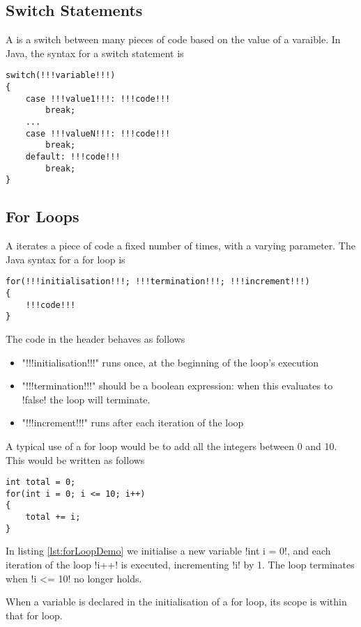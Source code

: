 \documentclass[11pt]{article}
\begin{document}
\subsection{Switch Statements}
A  is a switch between many pieces of code based on the value of a varaible. In Java, the syntax for a switch statement is
\vspace{-20pt}
\begin{lstlisting}[style=javaSyntax]
switch(!!!variable!!!)
{
    case !!!value1!!!: !!!code!!!
        break;
    ...
    case !!!valueN!!!: !!!code!!!
        break;
    default: !!!code!!!
        break;
}
\end{lstlisting}
\subsection{For Loops} \label{sec:forLoops}
A  iterates a piece of code a fixed number of times, with a varying parameter. The Java syntax for a for loop is
\vspace{-20pt}
\begin{lstlisting}[style=javaSyntax]
for(!!!initialisation!!!; !!!termination!!!; !!!increment!!!)
{
    !!!code!!!
}
\end{lstlisting}
The code in the header behaves as follows
\begin{itemize}
    \item \inlineJava"!!!initialisation!!!" runs once, at the beginning of the loop's execution
    \item \inlineJava"!!!termination!!!" should be a boolean expression: when this evaluates to \inlineJava!false! the loop will terminate.
    \item \inlineJava"!!!increment!!!" runs after each iteration of the loop
\end{itemize}
\begin{eg} A typical use of a for loop would be to add all the integers between 0 and 10. This would be written as follows
\begin{lstlisting}[caption=A typical use of a for loop, label=lst:forLoopDemo]
int total = 0;
for(int i = 0; i <= 10; i++)
{
    total += i;
}
\end{lstlisting}
In listing \ref{lst:forLoopDemo} we initialise a new variable \inlineJava!int i = 0!, and each iteration of the loop \inlineJava!i++! is executed, incrementing \inlineJava!i! by 1. The loop terminates when \inlineJava!i <= 10! no longer holds.
\end{eg}
\begin{note}
    When a variable is declared in the initialisation of a for loop, its scope is within that for loop.
\end{note}
\end{document}
